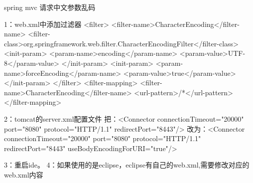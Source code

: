 spring mvc 请求中文参数乱码

1：web.xml中添加过滤器
<filter>
    <filter-name>CharacterEncoding</filter-name>
    <filter-class>org.springframework.web.filter.CharacterEncodingFilter</filter-class>
    <init-param>
        <param-name>encoding</param-name>
        <param-value>UTF-8</param-value>
    </init-param>
    <init-param>
        <param-name>forceEncoding</param-name>
        <param-value>true</param-value>
    </init-param>
</filter>
<filter-mapping>
    <filter-name>CharacterEncoding</filter-name>
    <url-pattern>/*</url-pattern>
</filter-mapping>

2：tomcat的server.xml配置文件
把：<Connector connectionTimeout="20000" port="8080" protocol="HTTP/1.1" redirectPort="8443"/>
改为：<Connector connectionTimeout="20000" port="8080" protocol="HTTP/1.1" redirectPort="8443" useBodyEncodingForURI="true"/>

3：重启ide。
4：如果使用的是eclipse，eclipse有自己的web.xml,需要修改对应的web.xml内容